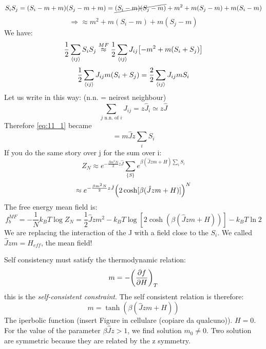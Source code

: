 \documentclass[../main/main.tex]{subfiles}
\begin{document}
\begin{equation}
  S_i S_j = (S_i - m + m) (S_j - m + m) = \cancel{ (S_i - m ) (S_j - m) }  + m^2 + m (S_j-m) + m (S_i-m)
\end{equation}
\begin{equation}
  \Rightarrow \approx m^2 + m(S_i-m) + m(S_j-m)
\end{equation}
We have:
\begin{equation}
  \frac{1}{2} \sum_{\expval{ij} }^{} S_i S_j \overset{MF}{\approx } \frac{1}{2} \sum_{\expval{ij} }^{} J_{ij} \qty[-m^2+m(S_i+S_j)]
\end{equation}
\begin{equation}
  \frac{1}{2} \sum_{\expval{ij} }^{} J_{ij} m(S_i+S_j) = \frac{2}{2} \sum_{\expval{ij} }^{} J_{ij} m S_i
  \label{eq:11_1}
\end{equation}
Let us write in this way: (n.n. = neirest neighbour)
\begin{equation}
  \sum_{j \text{ n.n. of } i}^{} J_{ij} = z \hat{J}_i \simeq  z \hat{J}
\end{equation}
Therefore \eqref{eq:11_1} became
\begin{equation}
  = m \hat{J} z \sum_{i}^{} S_i
\end{equation}
If you do the same story over j for the sum over i:
\begin{equation}
  Z_N \approx e^{-\frac{\beta m^2 N}{2} z \hat{J} } \sum_{\{ S \}  }^{}  e^{\beta (\hat{J}zm + H ) \sum_{i}^{} S_i }
\end{equation}
\begin{equation}
  \approx e^{-\frac{\beta m^2 N}{2} z \hat{J} } \qty(2 \cosh [\beta (\hat{J}zm+H )])^N
\end{equation}
The free energy mean field is:
\begin{equation}
  f_b^{MF} = - \frac{1}{N}k_B T \log{Z_N} = \frac{1}{2}\hat{J} z m^2 -k_B T \log{[2\cosh(\beta (\hat{J} z m + H))]} - k_B T \ln{2}
\end{equation}
We are replacing the interaction of the J with a field close to the \( S_i \). We called \( \hat{J} z m = H_{eff}  \), the mean field!

Self consistency  must satisfy the thermodynamic relation:
\begin{equation}
  m = - \qty( \pdv{f}{H})_T
\end{equation}
this is the \emph{self-consistent constraint}. The self consistent relation is therefore:
\begin{equation}
  m = \tanh (\beta (\hat{J}z m + H  ))
\end{equation}
The iperbolic function (insert Figure in cellulare (copiare da qualcuno)). \( H=0 \). For the value of the parameter \( \beta \hat{J} z > 1  \), we find solution \( m_0 \neq 0 \).  Two solution are symmetric because they are related by the z symmetry.
\end{document}
